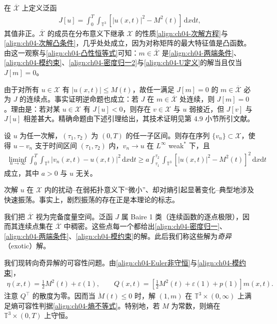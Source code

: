 ﻿\documentclass[../../main.tex]{subfiles}
\begin{document}
在 $\overline{\mathscr{X}}$ 上定义泛函
\begin{align}
J[u]=\int_{0}^{T}\int_{\mathbb{T}^{3}}\left[|u(x,t)|^{2}-M^{2}(t)\right]\,\mathrm{d}x\mathrm{d}t,
\label{align:ch04-J泛函}
\end{align}
其值非正。$\overline{\mathscr{X}}$ 的成员在分布意义下继承 $\mathscr{X}$ 的性质\eqref{align:ch04-次解方程}与\eqref{align:ch04-次解凸条件}，几乎处处成立，因为对称矩阵的最大特征值是凸函数。由这一观察与\eqref{align:ch04-凸性恒等式}可知：$m\in\overline{\mathscr{X}}$ 是\eqref{align:ch04-两端条件}、\eqref{align:ch04-模约束}、\eqref{align:ch04-密度归一2}与\eqref{align:ch04-U定义}的解当且仅当 $J[m]=0$。

由于对所有 $u\in\mathscr{X}$ 有 $|u(x,t)|\leqslant M(t)$，故任一满足 $J[m]=0$ 的 $m\in\overline{\mathscr{X}}$ 必为 $J$ 的连续点。事实证明逆命题也成立：若 $J$ 在 $m\in\overline{\mathscr{X}}$ 处连续，则 $J[m]=0$。理由是：若对某 $u\in\mathscr{X}$ 有 $J[u]<0$，则存在 $v\in\mathscr{X}$ 与 $u$ 弱接近，但 $J[v]$ 与 $J[u]$ 相差甚大。精确命题由下述引理给出，其技术证明见第 4.9 小节所引文献。

\begin{lemma}\label{lemma:ch04-次解扰动}
设 $u$ 为任一次解，$(\tau_{1},\tau_{2})$ 为 $(0,T)$ 的任一子区间。则存在序列 $\{v_{n}\}\subset\mathscr{X}$，使得 $u-v_{n}$ 支于时间区间 $(\tau_{1},\tau_{2})$ 内，$v_{n}\to u$ 在 $L^{\infty}$ weak$^{*}$ 下，且
\begin{align}
\liminf_{n\to\infty}\int_{0}^{T}\int_{\mathbb{T}^{3}}|v_{n}(x,t)-u(x,t)|^{2}\,\mathrm{d}x\mathrm{d}t\geqslant a\int_{\tau_{1}}^{\tau_{2}}\int_{\mathbb{T}^{3}}\left[|u(x,t)|^{2}-M^{2}(t)\right]^{2}\,\mathrm{d}x\mathrm{d}t
\label{align:ch04-次解扰动估计}
\end{align}
成立，其中 $a>0$ 与 $u$ 无关。
\end{lemma}

次解 $u$ 在 $\mathscr{X}$ 内的扰动--在弱拓扑意义下“微小”、却对熵引起显著变化--典型地涉及快速振荡。事实上，剧烈振荡的存在正是本理论的标志。

我们把 $\overline{\mathscr{X}}$ 视为完备度量空间。泛函 $J$ 属 Baire 1 类（连续函数的逐点极限），因而其连续点集在 $\overline{\mathscr{X}}$ 中稠密。这些点每一个都给出\eqref{align:ch04-密度归一}、\eqref{align:ch04-两端条件}、\eqref{align:ch04-模约束}的解。此后我们称这些解为\emph{奇异}（exotic）解。

我们现转向奇异解的可容性问题。由\eqref{align:ch04-Euler非守恒}与\eqref{align:ch04-模约束}，
\begin{align}
\eta(x,t)=\tfrac{1}{2}M^{2}(t)+\varepsilon(1),\qquad Q(x,t)=\left[\tfrac{1}{2}M^{2}(t)+\varepsilon(1)+p(1)\right]m(x,t).
\label{align:ch04-奇异熵}
\end{align}
注意 $Q^{\top}$ 的散度为零。因而当 $\dot{M}(t)\leqslant 0$ 时，解 $(1,m)$ 在 $\mathbb{T}^{3}\times(0,\infty)$ 上满足熵可容性判据\eqref{align:ch04-熵不等式}。特别地，若 $M$ 为常数，则熵在 $\mathbb{T}^{3}\times(0,T)$ 上守恒。
\end{document}
